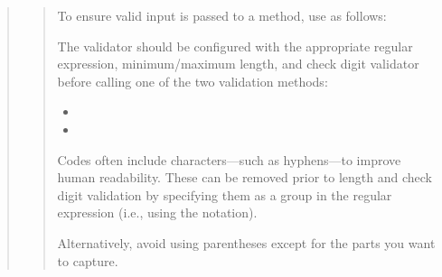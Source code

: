 \documentclass[letterpaper,10pt,english]{sphinxmanual}
\begin{document}
\begin{quote}
\begin{quote}
\sphinxAtStartPar
To ensure valid input is passed to a method, use  as follows:

\begin{sphinxVerbatim}[commandchars=\\\{\}]
  
    
\end{sphinxVerbatim}

\sphinxAtStartPar
The validator should be configured with the appropriate regular expression,
minimum/maximum length, and check digit validator before calling one of the two
validation methods:
\begin{itemize}
\item {} 
\sphinxAtStartPar
{}

\item {} 
\sphinxAtStartPar
{}

\end{itemize}

\sphinxAtStartPar
Codes often include  characters—such as hyphens—to improve human readability.
These can be removed prior to length and check digit validation by specifying them as
a  group in the regular expression (i.e., using the  notation).

\sphinxAtStartPar
Alternatively, avoid using parentheses except for the parts you want to capture.
\begin{quote}\begin{description}

\end{description}\end{quote}
\end{quote}
\end{quote}
\end{document}
